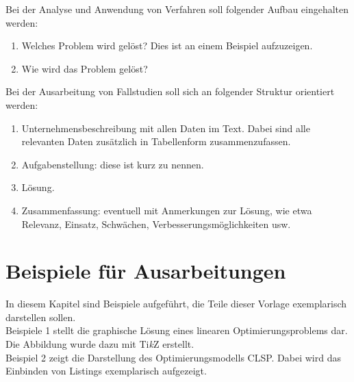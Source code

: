		\vspace{\baselineskip}
		
		Bei der Analyse und Anwendung von Verfahren soll folgender Aufbau eingehalten werden:
		\begin{enumerate}
            \item Welches Problem wird gelöst? Dies ist an einem Beispiel aufzuzeigen.
            \item Wie wird das Problem gelöst?
        \end{enumerate}
       
        \vspace{\baselineskip}
         
		Bei der Ausarbeitung von Fallstudien soll sich an folgender Struktur orientiert werden:
		\begin{enumerate}
            \item Unternehmensbeschreibung mit allen Daten im Text. Dabei sind alle relevanten Daten zusätzlich in Tabellenform zusammenzufassen.
            \item Aufgabenstellung: diese ist kurz zu nennen.
            \item Lösung.
            \item Zusammenfassung: eventuell mit Anmerkungen zur Lösung, wie etwa Relevanz, Einsatz, Schwächen, Verbesserungsmöglichkeiten usw.
        \end{enumerate}
		\pagebreak



		\section{Beispiele für Ausarbeitungen}
		\label{ch:bsp-ausarbeitungen}

		In diesem Kapitel sind Beispiele aufgeführt, die Teile dieser Vorlage exemplarisch darstellen sollen.\\
		Beispiele 1 stellt die graphische Lösung eines linearen Optimierungsproblems dar. Die Abbildung wurde dazu mit Ti\textit{k}Z erstellt.\\
		Beispiel 2 zeigt die Darstellung des Optimierungsmodells CLSP. Dabei wird das Einbinden von Listings exemplarisch aufgezeigt.
		
